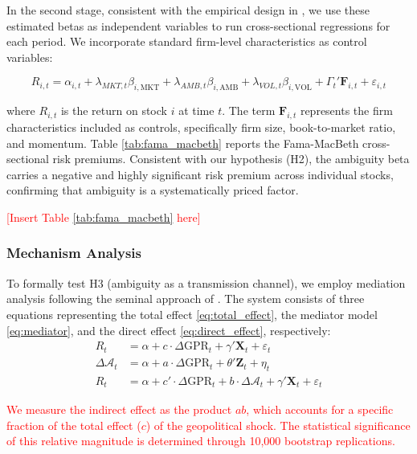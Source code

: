 \documentclass[preprint,12pt,authoryear]{elsarticle}
\begin{document}
In the second stage, consistent with the empirical design in \citet{Fama1992Cross}, we use these estimated betas as independent variables to run cross-sectional regressions for each period. We incorporate standard firm-level characteristics as control variables:

\begin{equation}
R_{i,t} = \alpha_{i,t} + \lambda_{MKT,t} \beta_{i,\text{MKT}} + \lambda_{AMB,t} \beta_{i,\text{AMB}} + \lambda_{VOL,t} \beta_{i,\text{VOL}} + \Gamma_{t}' \mathbf{F}_{i,t} + \varepsilon_{i,t}
\end{equation}

where $R_{i,t}$ is the return on stock $i$ at time $t$. The term $\mathbf{F}_{i,t}$ represents the firm characteristics included as controls, specifically firm size, book-to-market ratio, and momentum. Table \ref{tab:fama_macbeth} reports the Fama-MacBeth cross-sectional risk premiums. Consistent with our hypothesis (H2), the ambiguity beta carries a negative and highly significant risk premium across individual stocks, confirming that ambiguity is a systematically priced factor.

\textcolor{red}{[Insert Table \ref{tab:fama_macbeth} here]}

\subsubsection{Mechanism Analysis}

To formally test H3 (ambiguity as a transmission channel), we employ mediation analysis following the seminal approach of \citet{Baron1986Moderator}. The system consists of three equations representing the total effect \eqref{eq:total_effect}, the mediator model \eqref{eq:mediator}, and the direct effect \eqref{eq:direct_effect}, respectively:
\begin{align}
    R_{t} &= \alpha + c \cdot \Delta \text{GPR}_{t} + \gamma' \mathbf{X}_{t} + \varepsilon_{t} \label{eq:total_effect} \\
    \Delta \mathcal{A}_{t} &= \alpha + a \cdot \Delta \text{GPR}_{t} + \theta' \mathbf{Z}_{t} + \eta_{t} \label{eq:mediator} \\
    R_{t} &= \alpha + c' \cdot \Delta \text{GPR}_{t} + b \cdot \Delta \mathcal{A}_{t} + \gamma' \mathbf{X}_{t} + \varepsilon_{t} \label{eq:direct_effect}
\end{align}

\textcolor{red}{We measure the indirect effect as the product $ab$, which accounts for a specific fraction of the total effect ($c$) of the geopolitical shock. The statistical significance of this relative magnitude is determined through 10,000 bootstrap replications.}
\end{document}
